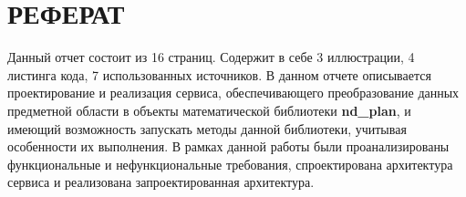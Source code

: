 \section*{\Large{РЕФЕРАТ}}
Данный отчет состоит из 16 страниц.
Содержит в себе 3 иллюстрации, 4 листинга кода, 7 использованных источников.
В данном отчете описывается проектирование и реализация сервиса, обеспечивающего
преобразование данных предметной области в объекты математической библиотеки \textbf{nd\_plan},
и имеющий возможность запускать методы данной библиотеки, учитывая особенности их выполнения.
В рамках данной работы были проанализированы функциональные и нефункциональные требования, спроектирована
архитектура сервиса и реализована запроектированная архитектура.